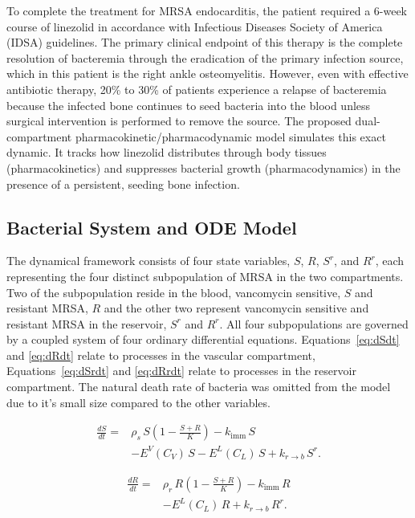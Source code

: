 \documentclass[journal]{IEEEtran}
\begin{document}
To complete the treatment for MRSA endocarditis, the patient required a 6-week course of linezolid in accordance with Infectious Diseases Society of America (IDSA) guidelines. The primary clinical endpoint of this therapy is the complete resolution of bacteremia through the eradication of the primary infection source, which in this patient is the right ankle osteomyelitis. However, even with effective antibiotic therapy, 20\% to 30\% of patients experience a relapse of bacteremia because the infected bone continues to seed bacteria into the blood unless surgical intervention is performed to remove the source. The proposed dual-compartment pharmacokinetic/pharmacodynamic model simulates this exact dynamic.  It tracks how linezolid distributes through body tissues (pharmacokinetics) and suppresses bacterial growth (pharmacodynamics) in the presence of a persistent, seeding bone infection.

\subsection{Bacterial System and ODE Model}
The dynamical framework consists of four state variables, $S$, $R$, $S^r$, and $R^r$, each representing the four distinct
subpopulation of MRSA in the two compartments.  Two of the subpopulation reside in the blood, vancomycin sensitive, $S$ and
resistant MRSA, $R$ and the other two represent vancomycin sensitive and resistant
MRSA in the reservoir, $S^r$ and $R^r$.  All four subpopulations are governed by a coupled system of four ordinary differential equations.
Equations~\eqref{eq:dSdt} and \eqref{eq:dRdt} relate to processes in the vascular compartment, Equations~\eqref{eq:dSrdt} and \eqref{eq:dRrdt}
relate to processes in the reservoir compartment.  The natural death rate of bacteria was omitted from the model due to it's small size
compared to the other variables.

\begin{equation}
\label{eq:dSdt}
\begin{aligned}
\frac{dS}{dt}
= {}& \rho_{s}\, S \left( 1 - \frac{S + R}{K} \right)
- k_{\text{imm}}\, S \\
&- E^{V}(C_V)\, S
- E^{L}(C_L)\, S
+ k_{r\to b}\, S^r .
\end{aligned}
\end{equation}

\begin{equation}
\label{eq:dRdt}
\begin{aligned}
\frac{dR}{dt}
= {}& \rho_{r}\,R \left( 1 - \frac{S + R}{K} \right)
- k_{\text{imm}}\, R \\
&- E^{L}(C_L)\, R
+ k_{r\to b}\, R^r .
\end{aligned}
\end{equation}
\end{document}
